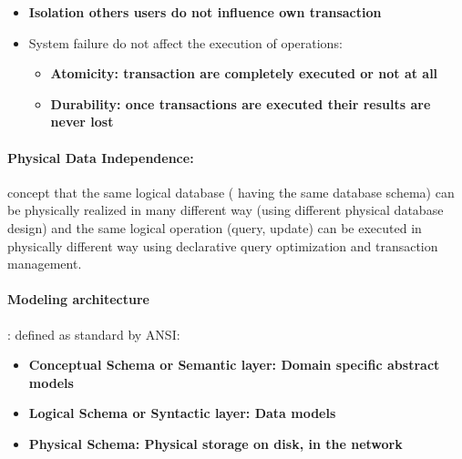 \begin{itemize}
	\item \bf{Isolation} others users do not influence own transaction
	\item System failure do not affect the execution of operations:
	\begin{itemize}
		\item \bf{Atomicity:} transaction are completely executed or not at all
		\item \bf{Durability:} once transactions are executed their results are never lost
	\end{itemize}
\end{itemize}

\paragraph{Physical Data Independence:}  concept that the same logical database ( having the same database schema) can be physically realized in many different way (using different physical database design) and the same logical operation (query, update) can be executed in physically different way using declarative query optimization and transaction management. 


\paragraph{Modeling architecture}: defined as standard by ANSI:
\begin{itemize}
	\item \bf{Conceptual Schema or Semantic layer:} Domain specific abstract models
	\item \bf{Logical Schema or Syntactic layer:} Data models
  	\item \bf{Physical Schema:} Physical storage on disk, in the network
\end{itemize}

